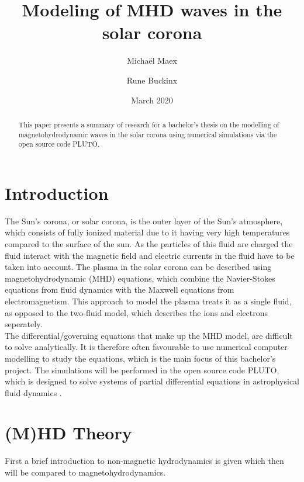 \documentclass[a4paper]{article}
\title{Modeling of MHD waves in the solar corona}
\author{Micha\"el Maex \and Rune Buckinx}
\date{March 2020}
\begin{document}
\maketitle

\begin{abstract}
    This paper presents a summary of research for a bachelor's thesis on the modelling of magnetohydrodynamic waves in the solar corona using numerical simulations via the open source code PLUTO. 
\end{abstract}
\tableofcontents

\listoftodos

\newpage
\section{Introduction} \label{sec:introduction}
The Sun's corona, or solar corona, is the outer layer of the Sun's atmosphere, which consists of fully ionized material due to it having very high temperatures compared to the surface of the sun. 
As the particles of this fluid are charged the fluid interact with the magnetic field and electric currents in the fluid have to be taken into account.  
The plasma in the solar corona can be described using magnetohydrodynamic (MHD) equations, which combine the Navier-Stokes equations from fluid dynamics with the Maxwell equations from electromagnetism. 
This approach to model the plasma treats it as a single fluid, as opposed to the two-fluid model, which describes the ions and electrons seperately.  \\

The differential/governing equations that make up the MHD model, are difficult to solve analytically. 
It is therefore often favourable to use numerical computer modelling to study the equations, which is the main focus of this bachelor's project. 
The simulations will be performed in the open source code PLUTO, which is designed to solve systems of partial differential equations in astrophysical fluid dynamics \cite{mignone2011pluto}. 

\section{(M)HD Theory} \label{sec:(m)hd_theory}

First a brief introduction to non-magnetic hydrodynamics is given which then will be compared to magnetohydrodynamics.
\end{document}
